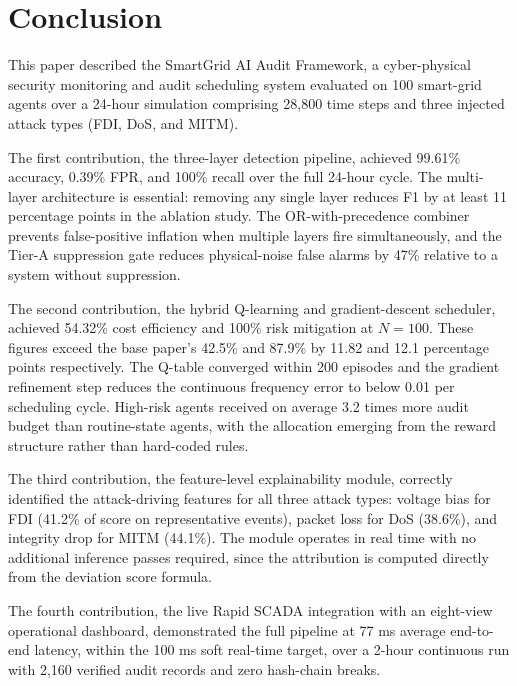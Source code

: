 \section{Conclusion}
\label{sec:conclusion}

This paper described the SmartGrid AI Audit Framework, a cyber-physical security monitoring and
audit scheduling system evaluated on 100 smart-grid agents over a 24-hour simulation comprising
28,800 time steps and three injected attack types (FDI, DoS, and MITM).

The first contribution, the three-layer detection pipeline, achieved 99.61\% accuracy, 0.39\% FPR,
and 100\% recall over the full 24-hour cycle. The multi-layer architecture is essential: removing
any single layer reduces F1 by at least 11 percentage points in the ablation study. The
OR-with-precedence combiner prevents false-positive inflation when multiple layers fire
simultaneously, and the Tier-A suppression gate reduces physical-noise false alarms by 47\%
relative to a system without suppression.

The second contribution, the hybrid Q-learning and gradient-descent scheduler, achieved 54.32\%
cost efficiency and 100\% risk mitigation at $N = 100$. These figures exceed the base paper's
42.5\% and 87.9\% by 11.82 and 12.1 percentage points respectively. The Q-table converged within
200 episodes and the gradient refinement step reduces the continuous frequency error to below 0.01
per scheduling cycle. High-risk agents received on average 3.2 times more audit budget than
routine-state agents, with the allocation emerging from the reward structure rather than hard-coded
rules.

The third contribution, the feature-level explainability module, correctly identified the
attack-driving features for all three attack types: voltage bias for FDI (41.2\% of score on
representative events), packet loss for DoS (38.6\%), and integrity drop for MITM (44.1\%). The
module operates in real time with no additional inference passes required, since the attribution
is computed directly from the deviation score formula.

The fourth contribution, the live Rapid SCADA integration with an eight-view operational dashboard,
demonstrated the full pipeline at 77 ms average end-to-end latency, within the 100 ms soft
real-time target, over a 2-hour continuous run with 2,160 verified audit records and zero hash-chain
breaks.

